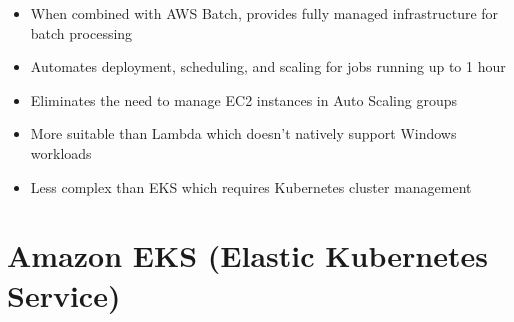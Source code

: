\documentclass[11pt,a4paper]{report}
\begin{document}
\begin{itemize}
\begin{itemize}
  \item When combined with AWS Batch, provides fully managed infrastructure for batch processing
  \item Automates deployment, scheduling, and scaling for jobs running up to 1 hour
  \item Eliminates the need to manage EC2 instances in Auto Scaling groups
  \item More suitable than Lambda which doesn't natively support Windows workloads
  \item Less complex than EKS which requires Kubernetes cluster management
\end{itemize}
\end{itemize}


\section{Amazon EKS (Elastic Kubernetes Service)}
\end{document}
